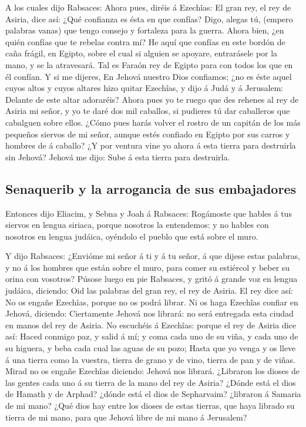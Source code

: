  A los cuales dijo Rabsaces: Ahora pues, diréis á Ezechîas:
El gran rey, el rey de Asiria, dice así: ¿Qué confianza es ésta en que
confías?  Digo, alegas tú, (empero palabras vanas) que tengo
consejo y fortaleza para la guerra. Ahora bien, ¿en quién confías que te
rebelas contra mí?  He aquí que confías en este bordón de
caña frágil, en Egipto, sobre el cual si alguien se apoyare, entrarásele
por la mano, y se la atravesará. Tal es Faraón rey de Egipto para con
todos los que en él confían.  Y si me dijeres, En Jehová
nuestro Dios confiamos; ¿no es éste aquel cuyos altos y cuyos altares
hizo quitar Ezechîas, y dijo á Judá y á Jerusalem: Delante de este altar
adoraréis?  Ahora pues yo te ruego que des rehenes al rey de
Asiria mi señor, y yo te daré dos mil caballos, si pudieres tú dar
caballeros que cabalguen sobre ellos.  ¿Cómo pues harás
volver el rostro de un capitán de los más pequeños siervos de mi señor,
aunque estés confiado en Egipto por sus carros y hombres de á caballo?
 ¿Y por ventura vine yo ahora á esta tierra para destruirla
sin Jehová? Jehová me dijo: Sube á esta tierra para destruirla.

\hypertarget{senaquerib-y-la-arrogancia-de-sus-embajadores}{%
\subsection{Senaquerib y la arrogancia de sus
embajadores}\label{senaquerib-y-la-arrogancia-de-sus-embajadores}}

 Entonces dijo Eliacim, y Sebna y Joah á Rabsaces:
Rogámoste que hables á tus siervos en lengua siriaca, porque nosotros la
entendemos: y no hables con nosotros en lengua judáica, oyéndolo el
pueblo que está sobre el muro.

 Y dijo Rabsaces: ¿Envióme mi señor á ti y á tu señor, á
que dijese estas palabras, y no á los hombres que están sobre el muro,
para comer su estiércol y beber su orina con vosotros? 
Púsose luego en pie Rabsaces, y gritó á grande voz en lengua judáica,
diciendo: Oid las palabras del gran rey, el rey de Asiria. 
El rey dice así: No os engañe Ezechîas, porque no os podrá librar.
 Ni os haga Ezechîas confiar en Jehová, diciendo:
Ciertamente Jehová nos librará: no será entregada esta ciudad en manos
del rey de Asiria.  No escuchéis á Ezechîas: porque el rey
de Asiria dice así: Haced conmigo paz, y salid á mí; y coma cada uno de
su viña, y cada uno de su higuera, y beba cada cual las aguas de su
pozo;  Hasta que yo venga y os lleve á una tierra como la
vuestra, tierra de grano y de vino, tierra de pan y de viñas.
 Mirad no os engañe Ezechîas diciendo: Jehová nos librará.
¿Libraron los dioses de las gentes cada uno á su tierra de la mano del
rey de Asiria?  ¿Dónde está el dios de Hamath y de Arphad?
¿dónde está el dios de Sepharvaim? ¿libraron á Samaria de mi mano?
 ¿Qué dios hay entre los dioses de estas tierras, que haya
librado su tierra de mi mano, para que Jehová libre de mi mano á
Jerusalem?

